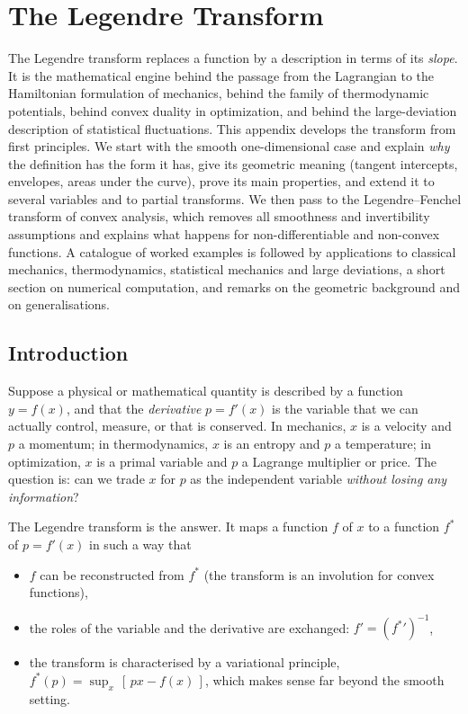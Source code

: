 
\chapter{The Legendre Transform}
\label{ch:lt}
The Legendre transform replaces a function by a description in terms of its
\emph{slope}. It is the mathematical engine behind the passage from the
Lagrangian to the Hamiltonian formulation of mechanics, behind the family of
thermodynamic potentials, behind convex duality in optimization, and behind
the large-deviation description of statistical fluctuations.  This appendix
develops the transform from first principles.  We start with the smooth
one-dimensional case and explain \emph{why} the definition has the form it
has, give its geometric meaning (tangent intercepts, envelopes, areas under
the curve), prove its main properties, and extend it to several variables and
to partial transforms.  We then pass to the Legendre--Fenchel transform of
convex analysis, which removes all smoothness and invertibility assumptions
and explains what happens for non-differentiable and non-convex functions.
A catalogue of worked examples is followed by applications to classical
mechanics, thermodynamics, statistical mechanics and large deviations, a
short section on numerical computation, and remarks on the geometric
background and on generalisations.

\section{Introduction}

Suppose a physical or mathematical quantity is described by a function
$y=f(x)$, and that the \emph{derivative} $p=f'(x)$ is the variable that we can
actually control, measure, or that is conserved.  In mechanics, $x$ is a
velocity and $p$ a momentum; in thermodynamics, $x$ is an entropy and $p$ a
temperature; in optimization, $x$ is a primal variable and $p$ a Lagrange
multiplier or price.  The question is: can we trade $x$ for $p$ as the
independent variable \emph{without losing any information}?

The Legendre transform is the answer.  It maps a function $f$ of $x$ to a
function $f^*$ of $p=f'(x)$ in such a way that
\begin{itemize}[nosep]
  \item $f$ can be reconstructed from $f^*$ (the transform is an involution
        for convex functions),
  \item the roles of the variable and the derivative are exchanged:
        $f'=(f^*{}')^{-1}$,
  \item the transform is characterised by a variational principle,
        $f^*(p)=\sup_x\,[\,px-f(x)\,]$, which makes sense far beyond the
        smooth setting.
\end{itemize}

